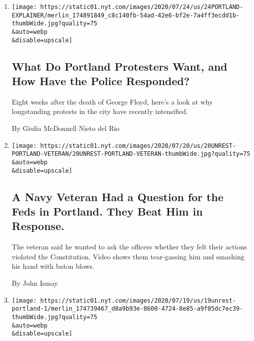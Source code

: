 \begin{enumerate}
\def\labelenumi{\arabic{enumi}.}
\item
  \href{/article/portland-protests-explained-protesters.html}{}

  \texttt{[image: https://static01.nyt.com/images/2020/07/24/us/24PORTLAND-EXPLAINER/merlin\_174891849\_c8c140fb-54ad-42e6-bf2e-7a4ff3ecdd1b-thumbWide.jpg?quality=75\\\&auto=webp\\\&disable=upscale]}

  \hypertarget{what-do-portland-protesters-want-and-how-have-the-police-responded}{%
  \subsection{What Do Portland Protesters Want, and How Have the Police
  Responded?}\label{what-do-portland-protesters-want-and-how-have-the-police-responded}}

  Eight weeks after the death of George Floyd, here's a look at why
  longstanding protests in the city have recently intensified.

  By Giulia McDonnell Nieto del Rio
\item
  \href{/2020/07/20/us/portland-protests-navy-christopher-david.html}{}

  \texttt{[image: https://static01.nyt.com/images/2020/07/20/us/20UNREST-PORTLAND-VETERAN/20UNREST-PORTLAND-VETERAN-thumbWide.jpg?quality=75\\\&auto=webp\\\&disable=upscale]}

  \hypertarget{a-navy-veteran-had-a-question-for-the-feds-in-portland-they-beat-him-in-response}{%
  \subsection{A Navy Veteran Had a Question for the Feds in Portland.
  They Beat Him in
  Response.}\label{a-navy-veteran-had-a-question-for-the-feds-in-portland-they-beat-him-in-response}}

  The veteran said he wanted to ask the officers whether they felt their
  actions violated the Constitution. Video shows them tear-gassing him
  and smashing his hand with baton blows.

  By John Ismay
\item
  \href{/2020/07/19/us/portland-protests.html}{}

  \texttt{[image: https://static01.nyt.com/images/2020/07/19/us/19unrest-portland-1/merlin\_174739467\_d8a9b93e-8600-4724-8e85-a9f05dc7ec39-thumbWide.jpg?quality=75\\\&auto=webp\\\&disable=upscale]}


\end{enumerate}
